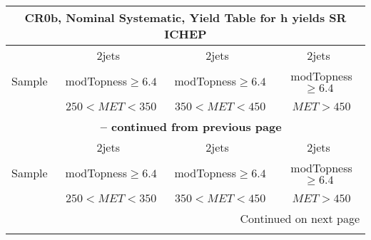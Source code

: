 \documentclass{article}
\begin{document}
 
 
 
 
\pagebreak 

 
 
 
 
\begin{longtable}{|l|c|c|c|} 
 
\multicolumn{4}{c}{ CR0b, Nominal Systematic, Yield Table for h yields SR ICHEP }\\* \hline 
  & 2jets  & 2jets  & 2jets \\* 
Sample  & ~modTopness$\ge6.4$  & ~modTopness$\ge6.4$  & ~modTopness$\ge6.4$ \\* 
  & ~$250<MET<350$  & ~$350<MET<450$  & ~$MET>450$ \\* 
\hline \hline 
\endfirsthead 
 
\multicolumn{4}{c}{{\bfseries \tablename\ \thetable{} -- continued from previous page}}\\* \hline 
  & 2jets  & 2jets  & 2jets \\* 
Sample  & ~modTopness$\ge6.4$  & ~modTopness$\ge6.4$  & ~modTopness$\ge6.4$ \\* 
  & ~$250<MET<350$  & ~$350<MET<450$  & ~$MET>450$ \\* 
\hline \hline 
\endhead 
 
\multicolumn{4}{|r|}{{Continued on next page}}\\* \hline 
\endfoot 
 
 
\endlastfoot 
 

\end{longtable}
\end{document}

